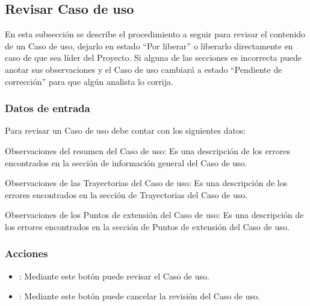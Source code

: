 \subsection{Revisar Caso de uso}

En esta subsección se describe el procedimiento a seguir para revisar el contenido de un Caso de uso, dejarlo en estado ``Por liberar'' o liberarlo directamente en caso de que sea líder del Proyecto. 
Si alguna de las secciones es incorrecta puede anotar sus observaciones y el Caso de uso cambiará a estado ``Pendiente de corrección'' para que algún analista lo corrija.


\subsubsection{Datos de entrada}
\begin{description}
	\item Para revisar un Caso de uso debe contar con los siguientes datos: \hspace{10pt}
	\begin{description}
	    \item Observaciones del resumen del Caso de uso: Es una descripción de los errores encontrados en la sección de información general del Caso de uso.
	    \item Observaciones de las Trayectorias del Caso de uso: Es una descripción de los errores encontrados en la sección de Trayectorias del Caso de uso.
	    \item Observaciones de los Puntos de extensión del Caso de uso: Es una descripción de los errores encontrados en la sección de Puntos de extensión del Caso de uso.
	 \end{description}
\end{description}

\subsubsection{Acciones}
\begin{itemize}
  \item {}: Mediante este botón puede revisar el Caso de uso.
  \item {}: Mediante este botón puede cancelar la revisión del Caso de uso.
\end{itemize}


